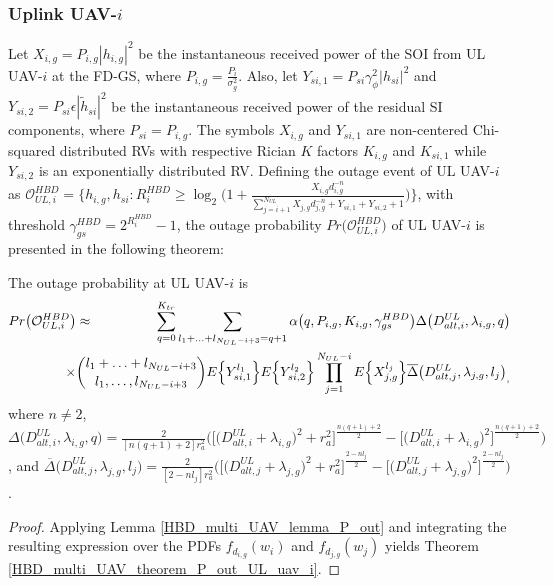 \subsubsection{Uplink UAV-$i$}
Let $X_{i,g}=P_{i,g}|h_{i,g}|^2$ be the instantaneous received power of the SOI from UL UAV-$i$ at the FD-GS, where $P_{i,g}=\frac{P_i}{\sigma_g^2}$. Also, let $Y_{si,1}=P_{si}\gamma_{\phi}^2|h_{si}|^2$ and $Y_{si,2}=P_{si}\epsilon|\widetilde{h}_{si}|^2$ be the instantaneous received power of the residual SI components, where $P_{si}=P_{i,g}$. The symbols $X_{i,g}$ and $Y_{si,1}$ are non-centered Chi-squared distributed RVs with respective Rician $K$ factors $K_{i,g}$ and $K_{si,1}$ while $Y_{si,2}$ is an exponentially distributed RV. Defining the outage event of UL UAV-$i$ as $\mathcal{O}_{UL,i}^{HBD} = \Big\{ h_{i,g}, h_{si} : R_{i}^{HBD} \geq \log_{2}\Big(1 + \frac{X_{i,g}d_{i,g}^{-n}}{\sum_{j=i+1}^{N_{UL}} X_{j,g}d_{j,g}^{-n} + Y_{si,1} + Y_{si,2} + 1}\Big)\Big\}$, with threshold $\gamma_{gs}^{HBD} = 2^{R_{i}^{HBD}}-1$, the outage probability $Pr\big(\mathcal{O}_{UL,i}^{HBD}\big)$ of UL UAV-$i$ is presented in the following theorem:

\begin{theorem} \label{HBD_multi_UAV_theorem_P_out_UL_uav_i}
The outage probability at UL UAV-$i$ is
\begin{eqnarray} \label{HBD_multi_UAV_P_out_UL_uav_i}
Pr\big(\mathcal{O}_{UL,i}^{HBD}\big) & \approx & \sum_{q=0}^{K_{tr}} \sum_{l_1+\ldots+l_{N_{UL}-i+3}=q+1} \alpha\big(q,P_{i,g},K_{i,g},\gamma_{gs}^{HBD}\big) \Delta\big(D_{alt,i}^{UL},\lambda_{i,g},q\big) \nonumber\\ 
& & \hspace{-1cm} \times \binom{l_1 + \ldots + l_{N_{UL}-i+3}}{l_1,\ldots, l_{N_{UL}-i+3}} E\Big\{Y_{si,1}^{l_1}\Big\} E\Big\{Y_{si,2}^{l_2}\Big\} \prod_{j=1}^{N_{UL}-i} E\Big\{X_{j,g}^{l_j}\Big\} \overline{\Delta}\big(D_{alt,j}^{UL},\lambda_{j,g},l_j\big)_,
\end{eqnarray}
where $n \neq 2$, $\Delta\big(D_{alt,i}^{UL},\lambda_{i,g},q\big) = \frac{2}{[n(q+1)+2]r_a^2} \Big( \big[\big(D_{alt,i}^{UL} + \lambda_{i,g}\big)^2 + r_a^2 \big]^{\frac{n(q+1)+2}{2}} - \big[\big(D_{alt,i}^{UL} + \lambda_{i,g}\big)^2 \big]^{\frac{n(q+1)+2}{2}} \Big)$, and $\overline{\Delta}\big(D_{alt,j}^{UL},\lambda_{j,g},l_j\big) = \frac{2}{[2-nl_j]r_a^2} \Big( \big[\big(D_{alt,j}^{UL} + \lambda_{j,g}\big)^2 + r_a^2 \big]^{\frac{2-nl_j}{2}} - \big[\big(D_{alt,j}^{UL} + \lambda_{j,g}\big)^2  \big]^{\frac{2-nl_j}{2}} \Big)$.
\end{theorem}
\begin{proof}
Applying Lemma \ref{HBD_multi_UAV_lemma_P_out} and integrating the resulting expression over the PDFs $f_{d_{i,g}}(w_i)$ and $f_{d_{j,g}}(w_j)$ yields Theorem \ref{HBD_multi_UAV_theorem_P_out_UL_uav_i}.
\end{proof}

